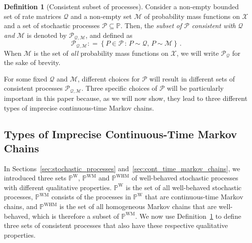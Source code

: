 \documentclass[10pt,a4paper]{paper}
\theoremstyle{definition}
\newtheorem{definition}{Definition}
\newcommand{\states}{\mathcal{X}}
\newcommand{\processes}{\mathbb{P}}
\newcommand{\wprocesses}{\processes^{\mathrm{W}}}
\newcommand{\wmprocesses}{\processes^{\mathrm{WM}}}
\newcommand{\whmprocesses}{\processes^{\mathrm{WHM}}}
\newcommand{\rateset}{\mathcal{Q}}
\newcommand{\coloneqq}{:\!=}
\newcommand{\ictmc}{{ICTMC}}
\begin{document}
\begin{definition}[Consistent subset of processes]\label{def:consistent_process_set}
Consider a non-empty bounded set of rate matrices $\rateset$ and a non-empty set $\mathcal{M}$ of probability mass functions on $\states$ and a set of stochastic processes $\mathcal{P}\subseteq\processes$. Then, the \emph{subset of $\mathcal{P}$ consistent with} $\rateset$ \emph{and} $\mathcal{M}$ is denoted by $\mathcal{P}_{\rateset,\mathcal{M}}$, and defined as
\begin{equation*}
\mathcal{P}_{\rateset,\mathcal{M}} \coloneqq \left\{P\in\mathcal{P}\,:\,P\sim\rateset,\,P\sim\mathcal{M}\right\}\,.
\end{equation*}
When $\mathcal{M}$ is the set of \emph{all} probability mass functions on $\states$, we will write $\mathcal{P}_{\rateset}$ for the sake of brevity.
\end{definition}
For some fixed $\mathcal{Q}$ and $\mathcal{M}$, different choices for $\mathcal{P}$ will result in different sets of consistent processes $\mathcal{P}_{\rateset,\mathcal{M}}$. Three specific choices of $\mathcal{P}$ will be particularly important in this paper because, as we will now show, they lead to three different types of imprecise continuous-time Markov chains.



\subsection{Types of Imprecise Continuous-Time Markov Chains}\label{subsec:types_ictmc}

In Sections~\ref{sec:stochastic_processes} and~\ref{sec:cont_time_markov_chains}, we introduced three sets $\wprocesses$, $\wmprocesses$ and $\whmprocesses$ of well-behaved stochastic processes with different qualitative properties. $\wprocesses$ is the set of all well-behaved stochastic processes, $\wmprocesses$ consists of the processes in $\wprocesses$ that are continuous-time Markov chains, and $\whmprocesses$ is the set of all homogeneous Markov chains that are well-behaved, which is therefore a subset of $\wmprocesses$. We now use Definition~\ref{def:consistent_process_set} to define three sets of consistent processes that also have these respective qualitative properties. 
\end{document}
